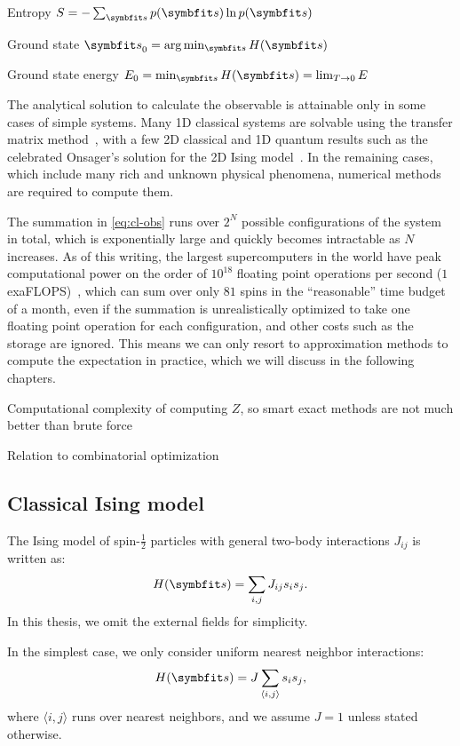 Entropy $S = -\sum_\vs p(\vs) \ln p(\vs)$

Ground state $\vs_0 = \arg\min_\vs H(\vs)$

Ground state energy $E_0 = \min_\vs H(\vs) = \lim_{T \to 0} E$

The analytical solution to calculate the observable is attainable only in some cases of simple systems. Many 1D classical systems are solvable using the transfer matrix method~\cite{chaikin1995principles5}, with a few 2D classical and 1D quantum results such as the celebrated Onsager's solution for the 2D Ising model~\cite{onsager1944crystal, baxter1995solvable,march2016exactly, caravelli2022some}. In the remaining cases, which include many rich and unknown physical phenomena, numerical methods are required to compute them.

The summation in \cref{eq:cl-obs} runs over $2^N$ possible configurations of the system in total, which is exponentially large and quickly becomes intractable as $N$ increases. As of this writing, the largest supercomputers in the world have peak computational power on the order of $10^{18}$ floating point operations per second ($1$ exaFLOPS)~\cite{kogge2022frontier}, which can sum over only $81$ spins in the ``reasonable'' time budget of a month, even if the summation is unrealistically optimized to take one floating point operation for each configuration, and other costs such as the storage are ignored. This means we can only resort to approximation methods to compute the expectation in practice, which we will discuss in the following chapters.

Computational complexity of computing $Z$, so smart exact methods are not much better than brute force

Relation to combinatorial optimization

\subsection{Classical Ising model}

The Ising model of spin-$\frac{1}{2}$ particles with general two-body interactions $J_{i j}$ is written as:
\begin{equation}
H(\vs) = \sum_{i, j} J_{i j} s_i s_j.
\label{eq:cl-ising-general}
\end{equation}
In this thesis, we omit the external fields for simplicity.

In the simplest case, we only consider uniform nearest neighbor interactions:
\begin{equation}
H(\vs) = J \sum_{\langle i, j \rangle} s_i s_j,
\label{eq:cl-ising}
\end{equation}
where $\langle i, j \rangle$ runs over nearest neighbors, and we assume $J = 1$ unless stated otherwise.

